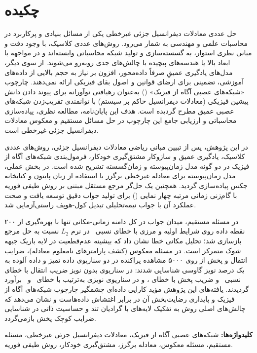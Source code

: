 \chapter*{چکیده}
{}

حل عددی معادلات دیفرانسیل جزئی غیرخطی یکی از مسائل بنیادی و پرکاربرد در محاسبات علمی و مهندسی به شمار می‌رود. روش‌های عددی کلاسیک، با وجود دقت و مبانی نظری استوار، به گسسته‌سازی و تولید شبکه محاسباتی وابسته‌اند و در مواجهه با ابعاد بالا یا هندسه‌های پیچیده با چالش‌های جدی روبه‌رو می‌شوند. از سوی دیگر، مدل‌های یادگیری عمیقِ صرفاً داده‌محور، افزون بر نیاز به حجم بالایی از داده‌های آموزشی، تضمینی برای ارضای قوانین و اصول بقای فیزیکی ارائه نمی‌دهند. چارچوب «شبکه‌های عصبی آگاه از فیزیک» () به‌عنوان رهیافتی نوآورانه برای پیوند دادن دانش پیشین فیزیکی (معادلات دیفرانسیل حاکم بر سیستم) با توانمندی تقریب‌زدن شبکه‌های عصبی عمیق مطرح گردیده است. هدف این پایان‌نامه، مطالعه نظری، پیاده‌سازی محاسباتی و ارزیابی جامع این چارچوب در حل مسائل مستقیم و معکوس معادلات دیفرانسیل جزئی غیرخطی است.

در این پژوهش، پس از تبیین مبانی ریاضی معادلات دیفرانسیل جزئی، روش‌های عددی کلاسیک، یادگیری عمیق و سازوکار مشتق‌گیری خودکار، فرمول‌بندی شبکه‌های آگاه از فیزیک در دو گونه مدل زمان‌پیوسته و زمان‌گسسته تشریح شده است. در بخش عملی، مدل زمان‌پیوسته برای معادله غیرخطی برگرز با استفاده از زبان پایتون و کتابخانه جکس پیاده‌سازی گردید. همچنین یک حل‌گر مرجع مستقل مبتنی بر روش طیفی فوریه با گام‌زنی زمانی مرتبه چهار نمایی () برای تولید جواب دقیق توسعه یافت و صحت عملکرد آن با جواب نیمه‌تحلیلی تبدیل کول-هوپف راستی‌آزمایی شد.

در مسئله مستقیم، میدان جواب در کل دامنه زمانی-مکانی تنها با بهره‌گیری از ۲۰۰ نقطه داده روی شرایط اولیه و مرزی با خطای نسبی \FwdRelErr\ در نرم $L_2$ نسبت به حل مرجع بازسازی شد؛ تحلیل مکانی خطا نشان داد که بیشینه عدم‌قطعیت در لایه باریک جبهه شوک متمرکز است. در مسئله معکوس (کشف پارامترهای نامعلوم معادله)، ضرایب انتقال و پخش از روی ۵۰۰۰ مشاهده پراکنده در دو سناریوی داده تمیز و داده آلوده به یک درصد نویز گاوسی شناسایی شدند: در سناریوی بدون نویز ضریب انتقال با خطای نسبی \LamIErrClean\ و ضریب پخش با خطای \LamIIErrClean، و در سناریوی نویزی به‌ترتیب با خطای \LamIErrNoisy\ و \LamIIErrNoisy\ برآورد گردیدند. یافته‌های این پژوهش مؤید کارایی داده‌ای چشمگیر چارچوب شبکه‌های آگاه از فیزیک و پایداری رضایت‌بخش آن در برابر اغتشاش داده‌هاست و نشان می‌دهد که چالش‌های اصلی روش به تفکیک لایه‌های با گرادیان تند و حساسیت ذاتی در شناسایی ضرایب کوچک پخش بازمی‌گردد.

\vspace{0.8cm}
\noindent\textbf{کلیدواژه‌ها:} شبکه‌های عصبی آگاه از فیزیک، معادلات دیفرانسیل جزئی غیرخطی، مسئله مستقیم، مسئله معکوس، معادله برگرز، مشتق‌گیری خودکار، روش طیفی فوریه.
